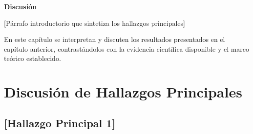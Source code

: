 
\justifying
\setlength{\parskip}{0pt}

\begin{center}
{\fontsize{12}{14}\selectfont\bfseries Discusión}\\[24pt]
\end{center}
\label{cap:discusion}


{[Párrafo introductorio que sintetiza los hallazgos principales]}

En este capítulo se interpretan y discuten los resultados presentados en el capítulo anterior, contrastándolos con la evidencia científica disponible y el marco teórico establecido.


\section{Discusión de Hallazgos Principales}
\label{sec:discusion_hallazgos}

\subsection{{[Hallazgo Principal 1]}}
\label{subsec:discusion_hallazgo1}


